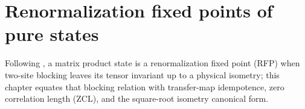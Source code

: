 
\chapter{Renormalization fixed points of pure states}\label{ch:mps_rfp}

Following \cite[Section~3]{Cirac2016MPDO_arXiv}, a matrix product state is a
renormalization fixed point (RFP) when two-site blocking leaves its tensor
invariant up to a physical isometry; this chapter equates that blocking
relation with transfer-map idempotence, zero correlation length (ZCL), and
the square-root isometry canonical form.


